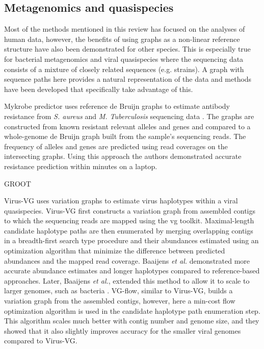 
\subsection{Metagenomics and quasispecies}

Most of the methods mentioned in this review has focused on the analyses of human data, however, the benefits of using graphs as a non-linear reference structure have also been demonstrated for other species.
This is especially true for bacterial metagenomics and viral quasispecies where the sequencing data consists of a mixture of closely related sequences (e.g. strains).
A graph with sequence paths here provides a natural representation of the data and methods have been developed that specifically take advantage of this. 

Mykrobe predictor uses reference de Bruijn graphs to estimate antibody resistance from \textit{S. aureus} and \textit{M. Tuberculosis} sequencing data \cite{Bradley2015-kl}.
The graphs are constructed from known resistant relevant alleles and genes and compared to a whole-genome de Bruijn graph built from the sample's sequencing reads.
The frequency of alleles and genes are predicted using read coverages on the intersecting graphs.
Using this approach the authors demonstrated accurate resistance prediction within minutes on a laptop.  

GROOT \cite{Rowe2018-bg}

Virus-VG uses variation graphs to estimate virus haplotypes within a viral quasispecies.
Virus-VG first constructs a variation graph from assembled contigs to which the sequencing reads are mapped using the vg toolkit.
Maximal-length candidate haplotype paths are then enumerated by merging overlapping contigs in a breadth-first search type procedure and their abundances estimated using an optimization algorithm that minimize the difference between predicted abundances and the mapped read coverage. 
Baaijens \textit{et al.} demonstrated more accurate abundance estimates and longer haplotypes compared to reference-based approaches.
Later, Baaijens \textit{et al.}, extended this method to allow it to scale to larger genomes, such as bacteria \cite{Baaijens2019-ha}.
VG-flow, similar to Virus-VG, builds a variation graph from the assembled contigs, however, here a min-cost flow optimization algorithm is used in the candidate haplotype path enumeration step.
This algorithm scales much better with contig number and genome size, and they showed that it also slightly improves accuracy for the smaller viral genomes compared to Virus-VG. 

